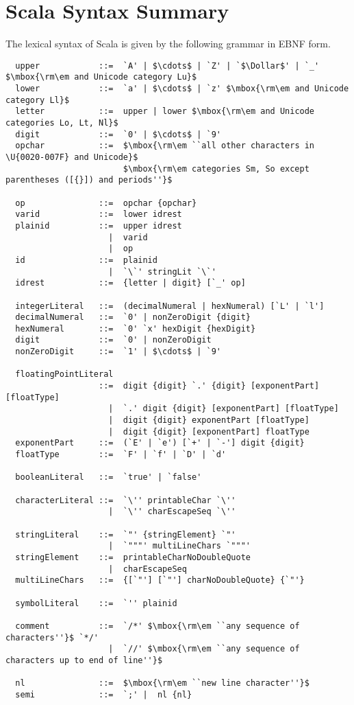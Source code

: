 
\chapter{Scala Syntax Summary}\label{sec:syntax}

The lexical syntax of Scala is given by the following grammar in EBNF
form.

{\small
\begin{lstlisting}
  upper            ::=  `A' | $\cdots$ | `Z' | `$\Dollar$' | `_' $\mbox{\rm\em and Unicode category Lu}$
  lower            ::=  `a' | $\cdots$ | `z' $\mbox{\rm\em and Unicode category Ll}$
  letter           ::=  upper | lower $\mbox{\rm\em and Unicode categories Lo, Lt, Nl}$
  digit            ::=  `0' | $\cdots$ | `9'
  opchar           ::=  $\mbox{\rm\em ``all other characters in \U{0020-007F} and Unicode}$
                        $\mbox{\rm\em categories Sm, So except parentheses ([{}]) and periods''}$

  op               ::=  opchar {opchar} 
  varid            ::=  lower idrest
  plainid          ::=  upper idrest
                     |  varid
                     |  op
  id               ::=  plainid
                     |  `\`' stringLit `\`'
  idrest           ::=  {letter | digit} [`_' op]

  integerLiteral   ::=  (decimalNumeral | hexNumeral) [`L' | `l']
  decimalNumeral   ::=  `0' | nonZeroDigit {digit}
  hexNumeral       ::=  `0' `x' hexDigit {hexDigit}
  digit            ::=  `0' | nonZeroDigit
  nonZeroDigit     ::=  `1' | $\cdots$ | `9'

  floatingPointLiteral 
                   ::=  digit {digit} `.' {digit} [exponentPart] [floatType]
                     |  `.' digit {digit} [exponentPart] [floatType]
                     |  digit {digit} exponentPart [floatType]
                     |  digit {digit} [exponentPart] floatType
  exponentPart     ::=  (`E' | `e') [`+' | `-'] digit {digit}
  floatType        ::=  `F' | `f' | `D' | `d'

  booleanLiteral   ::=  `true' | `false'

  characterLiteral ::=  `\'' printableChar `\''
                     |  `\'' charEscapeSeq `\''

  stringLiteral    ::=  `"' {stringElement} `"'
                     |  `"""' multiLineChars `"""'
  stringElement    ::=  printableCharNoDoubleQuote 
                     |  charEscapeSeq
  multiLineChars   ::=  {[`"'] [`"'] charNoDoubleQuote} {`"'}

  symbolLiteral    ::=  `'' plainid

  comment          ::=  `/*' $\mbox{\rm\em ``any sequence of characters''}$ `*/'
                     |  `//' $\mbox{\rm\em ``any sequence of characters up to end of line''}$

  nl               ::=  $\mbox{\rm\em ``new line character''}$
  semi             ::=  `;' |  nl {nl}       
\end{lstlisting}}

